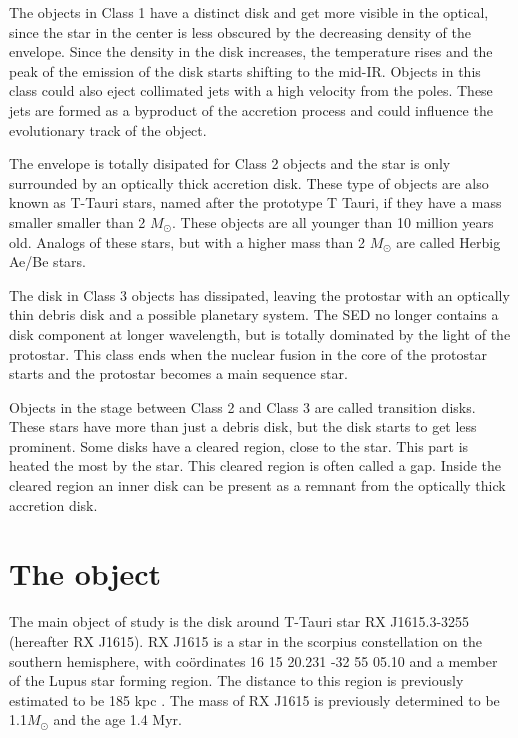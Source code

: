 \documentclass[twoside,single]{lion-msc}
\begin{document}
The objects in Class 1 have a distinct disk and get more visible in the optical, since the star in the center is less obscured by the decreasing density of the envelope. Since the density in the disk increases, the temperature rises and the peak of the emission of the disk starts shifting to the mid-IR. Objects in this class could also eject collimated jets with a high velocity from the poles. These jets are formed as a byproduct of the accretion process and could influence the evolutionary track of the object.
\bigskip

The envelope is totally disipated for Class 2 objects and the star is only surrounded by an optically thick accretion disk. These type of objects are also known as T-Tauri stars, named after the prototype T Tauri, if they have a mass smaller smaller than 2 $M_\odot$. These objects are all younger than 10 million years old. Analogs of these stars, but with a higher mass than 2 $M_\odot$ are called Herbig Ae/Be stars. 
\bigskip

The disk in Class 3 objects has dissipated, leaving the protostar with an optically thin debris disk and a possible planetary system. The SED no longer contains a disk component at longer wavelength, but is totally dominated by the light of the protostar. This class ends when the nuclear fusion in the core of the protostar starts and the protostar becomes a main sequence star.
\bigskip

Objects in the stage between Class 2 and Class 3 are called transition disks. These stars  have more than just a debris disk, but the disk starts to get less prominent. Some disks have a cleared region, close to the star. This part is heated the most by the star. This cleared region is often called a gap. Inside the cleared region an inner disk can be present as a remnant from the optically thick accretion disk.

\section{The object}
The main object of study is the disk around T-Tauri star RX J1615.3-3255 (hereafter RX J1615). RX J1615 is a star in the scorpius constellation on the southern hemisphere, with co\"ordinates 16 15 20.231 -32 55 05.10 and a member of the Lupus star forming region. The distance to this region is previously estimated to be 185 kpc \cite{Krautter1997}. The mass of RX J1615 is previously determined to be 1.1$M_\odot$ and the age 1.4 Myr\cite{Wahhaj2010}. 
\end{document}
